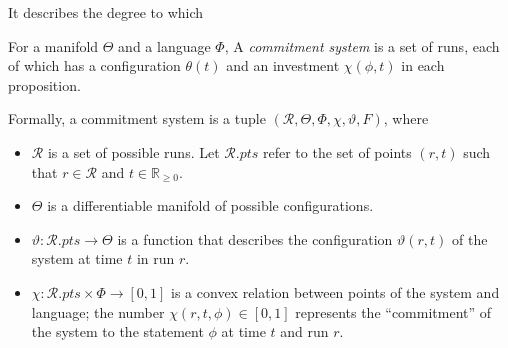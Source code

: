 \documentclass{article}
\newcommand\pts[1]{#1.\mathit{pts}}
\newcommand\R{\mathcal R}
\begin{document}
It describes the degree to which 



\begin{defn}
    For a manifold $\Theta$ and a language $\Phi$, 
    A \emph{commitment system}
    is a set of runs, each of which has a configuration $\theta(t)$
    and an investment $\chi(\phi, t)$ in each proposition.

    Formally, a commitment system is a tuple
    $(\R, \Theta, \Phi, \chi, \vartheta, F)$,
    where
    \begin{itemize}[]
        \item $\R$ is a set of possible runs.
        Let $\pts \R$ refer to the set of points $(r,t)$ such that $r \in \R$ and $t \in \mathbb R_{\ge 0}$.
        \item $\Theta$ is a differentiable manifold of possible configurations.
        \item $\vartheta : \pts \R \to \Theta$ is a function that                describes the configuration $\vartheta(r,t)$ of the system at time $t$ in run $r$.
        \item
        $\chi: \pts \R \times \Phi \to [0,1]$
        is a convex relation between points of the system and language;
        the number $\chi(r, t, \phi) \in [0,1]$ represents the ``commitment'' of the system to the statement $\phi$ at time $t$ and run $r$.


\end{itemize}
\end{defn}
\end{document}
